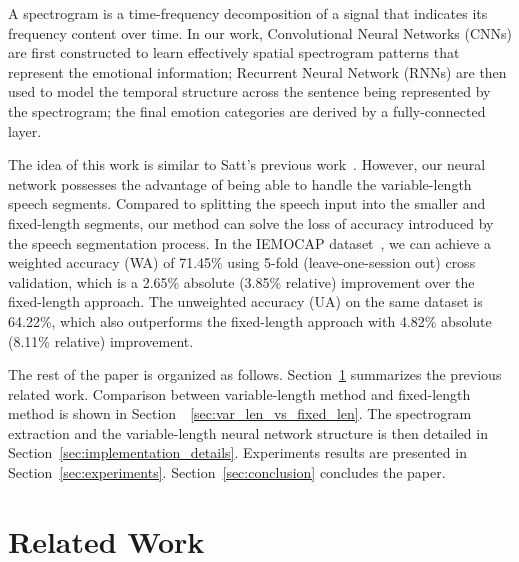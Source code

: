 \documentclass[a4paper]{article}
\begin{document}
A spectrogram is a time-frequency decomposition of a signal that indicates its frequency content over time. In our work, Convolutional Neural Networks (CNNs) are first constructed to learn effectively spatial spectrogram patterns that represent the emotional information; Recurrent Neural Network (RNNs) are then used to model the temporal structure across the sentence being represented by the spectrogram; the final emotion categories are derived by a fully-connected layer.

The idea of this work is similar to Satt's previous work~\cite{satt2017}. However, our neural network possesses the advantage of being able to handle the variable-length speech segments. Compared to splitting the speech input into the smaller and fixed-length segments, our method can solve the loss of accuracy introduced by the speech segmentation process. In the IEMOCAP dataset~\cite{busso2008}, we can achieve a weighted accuracy (WA) of 71.45\% using 5-fold (leave-one-session out) cross validation, which is a 2.65\% absolute (3.85\% relative) improvement over the fixed-length approach. The unweighted accuracy (UA) on the same dataset is 64.22\%, which also outperforms the fixed-length approach with 4.82\% absolute (8.11\% relative) improvement.

The rest of the paper is organized as follows. Section~\ref{sec:related_work} summarizes the previous related work. Comparison between variable-length method and fixed-length method is shown in Section~~\ref{sec:var_len_vs_fixed_len}. The spectrogram extraction and the variable-length neural network structure is then detailed in Section~\ref{sec:implementation_details}. Experiments results are presented in Section~\ref{sec:experiments}. Section~\ref{sec:conclusion} concludes the paper.

\section{Related Work}
\label{sec:related_work}

\end{document}
